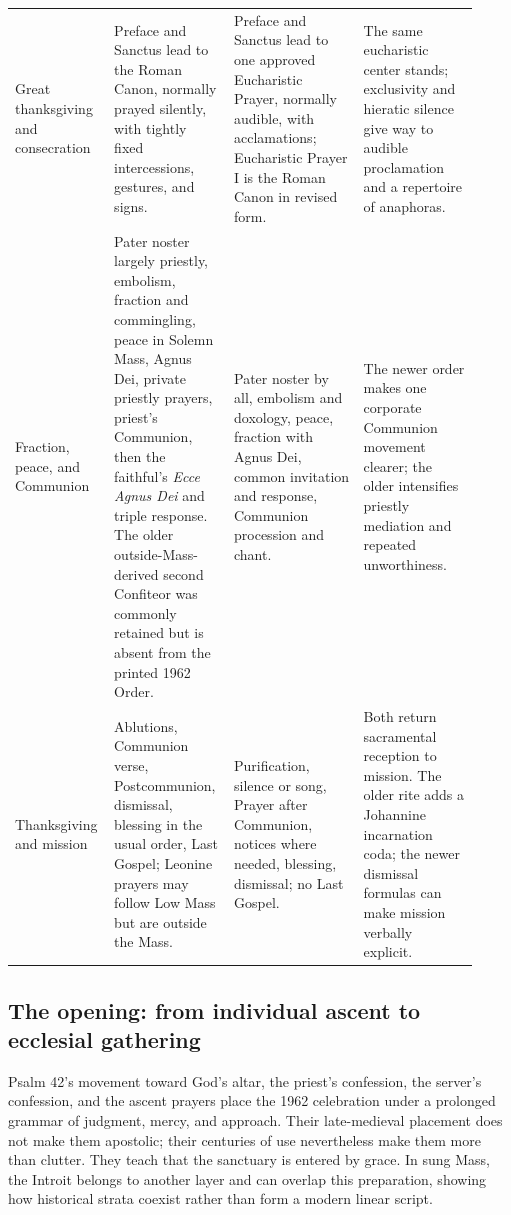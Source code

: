 \begin{longtable}{>{\bfseries\raggedright\arraybackslash}p{0.16\linewidth}>{\raggedright\arraybackslash}p{0.25\linewidth}>{\raggedright\arraybackslash}p{0.27\linewidth}>{\raggedright\arraybackslash}p{0.24\linewidth}}
Great thanksgiving and consecration & Preface and Sanctus lead to the Roman Canon, normally prayed silently, with tightly fixed intercessions, gestures, and signs. & Preface and Sanctus lead to one approved Eucharistic Prayer, normally audible, with acclamations; Eucharistic Prayer I is the Roman Canon in revised form. & The same eucharistic center stands; exclusivity and hieratic silence give way to audible proclamation and a repertoire of anaphoras.\\
Fraction, peace, and Communion & Pater noster largely priestly, embolism, fraction and commingling, peace in Solemn Mass, Agnus Dei, private priestly prayers, priest's Communion, then the faithful's \emph{Ecce Agnus Dei} and triple response. The older outside-Mass-derived second Confiteor was commonly retained but is absent from the printed 1962 Order. & Pater noster by all, embolism and doxology, peace, fraction with Agnus Dei, common invitation and response, Communion procession and chant. & The newer order makes one corporate Communion movement clearer; the older intensifies priestly mediation and repeated unworthiness.\\
Thanksgiving and mission & Ablutions, Communion verse, Postcommunion, dismissal, blessing in the usual order, Last Gospel; Leonine prayers may follow Low Mass but are outside the Mass. & Purification, silence or song, Prayer after Communion, notices where needed, blessing, dismissal; no Last Gospel. & Both return sacramental reception to mission. The older rite adds a Johannine incarnation coda; the newer dismissal formulas can make mission verbally explicit.\\
\bottomrule
\end{longtable}

\subsection{The opening: from individual ascent to ecclesial gathering}

Psalm 42's movement toward God's altar, the priest's confession, the server's confession, and the ascent prayers place the 1962 celebration under a prolonged grammar of judgment, mercy, and approach. Their late-medieval placement does not make them apostolic; their centuries of use nevertheless make them more than clutter. They teach that the sanctuary is entered by grace. In sung Mass, the Introit belongs to another layer and can overlap this preparation, showing how historical strata coexist rather than form a modern linear script.

